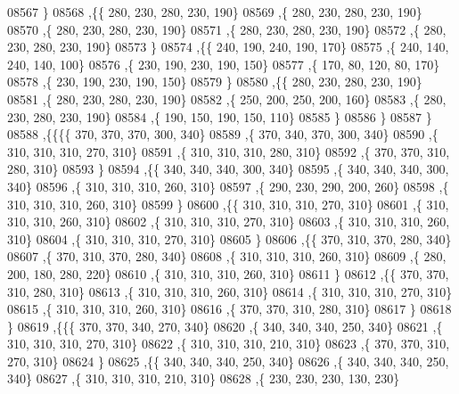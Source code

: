 \begin{DoxyCode}
08567     \}
08568    ,\{\{   280,   230,   280,   230,   190\}
08569     ,\{   280,   230,   280,   230,   190\}
08570     ,\{   280,   230,   280,   230,   190\}
08571     ,\{   280,   230,   280,   230,   190\}
08572     ,\{   280,   230,   280,   230,   190\}
08573     \}
08574    ,\{\{   240,   190,   240,   190,   170\}
08575     ,\{   240,   140,   240,   140,   100\}
08576     ,\{   230,   190,   230,   190,   150\}
08577     ,\{   170,    80,   120,    80,   170\}
08578     ,\{   230,   190,   230,   190,   150\}
08579     \}
08580    ,\{\{   280,   230,   280,   230,   190\}
08581     ,\{   280,   230,   280,   230,   190\}
08582     ,\{   250,   200,   250,   200,   160\}
08583     ,\{   280,   230,   280,   230,   190\}
08584     ,\{   190,   150,   190,   150,   110\}
08585     \}
08586    \}
08587   \}
08588  ,\{\{\{\{   370,   370,   370,   300,   340\}
08589     ,\{   370,   340,   370,   300,   340\}
08590     ,\{   310,   310,   310,   270,   310\}
08591     ,\{   310,   310,   310,   280,   310\}
08592     ,\{   370,   370,   310,   280,   310\}
08593     \}
08594    ,\{\{   340,   340,   340,   300,   340\}
08595     ,\{   340,   340,   340,   300,   340\}
08596     ,\{   310,   310,   310,   260,   310\}
08597     ,\{   290,   230,   290,   200,   260\}
08598     ,\{   310,   310,   310,   260,   310\}
08599     \}
08600    ,\{\{   310,   310,   310,   270,   310\}
08601     ,\{   310,   310,   310,   260,   310\}
08602     ,\{   310,   310,   310,   270,   310\}
08603     ,\{   310,   310,   310,   260,   310\}
08604     ,\{   310,   310,   310,   270,   310\}
08605     \}
08606    ,\{\{   370,   310,   370,   280,   340\}
08607     ,\{   370,   310,   370,   280,   340\}
08608     ,\{   310,   310,   310,   260,   310\}
08609     ,\{   280,   200,   180,   280,   220\}
08610     ,\{   310,   310,   310,   260,   310\}
08611     \}
08612    ,\{\{   370,   370,   310,   280,   310\}
08613     ,\{   310,   310,   310,   260,   310\}
08614     ,\{   310,   310,   310,   270,   310\}
08615     ,\{   310,   310,   310,   260,   310\}
08616     ,\{   370,   370,   310,   280,   310\}
08617     \}
08618    \}
08619   ,\{\{\{   370,   370,   340,   270,   340\}
08620     ,\{   340,   340,   340,   250,   340\}
08621     ,\{   310,   310,   310,   270,   310\}
08622     ,\{   310,   310,   310,   210,   310\}
08623     ,\{   370,   370,   310,   270,   310\}
08624     \}
08625    ,\{\{   340,   340,   340,   250,   340\}
08626     ,\{   340,   340,   340,   250,   340\}
08627     ,\{   310,   310,   310,   210,   310\}
08628     ,\{   230,   230,   230,   130,   230\}

\end{DoxyCode}
